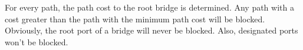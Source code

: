 For every path, the path cost to the root bridge is determined. Any path with a cost greater than the path with the minimum path cost will be blocked. Obviously, the root port of a bridge will never be blocked. Also, designated ports won't be blocked.